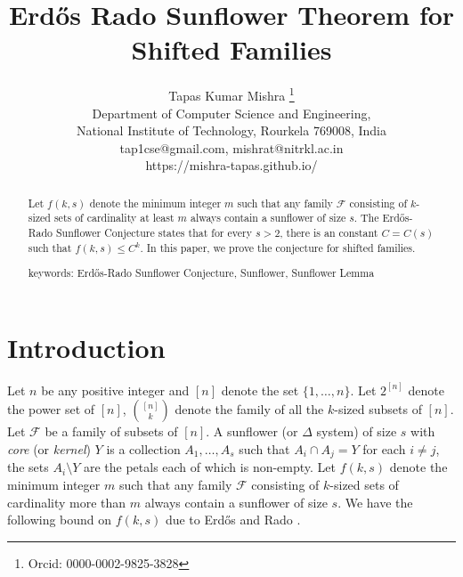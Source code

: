 \documentclass[runningheads,12pt,a4paper]{article}
\begin{document}
	\title{Erd\H{o}s Rado Sunflower Theorem for Shifted Families}
	\author{Tapas Kumar Mishra \footnote{Orcid: 0000-0002-9825-3828} \\
		Department of Computer Science and Engineering,\\
		National Institute of Technology, Rourkela
		769008, India\\
		tap1cse@gmail.com, mishrat@nitrkl.ac.in\\
		https://mishra-tapas.github.io/}
	\maketitle              %
	\begin{abstract}
		Let $f(k,s)$ denote the minimum integer $m$ such that
		any family $\mathcal{F}$ consisting of $k$-sized sets of cardinality at least $m$ always contain a sunflower of size $s$. The Erd\H{o}s-Rado Sunflower Conjecture states that 
		for every $s >2$, there is an constant $C=C(s)$ such that $f(k,s) \leq C^k$.
		In this paper, we prove the conjecture for shifted families.
		
		keywords: {Erd\H{o}s-Rado Sunflower Conjecture, Sunflower, Sunflower Lemma}
	\end{abstract}
	\section{Introduction}
	Let $n$ be any positive integer and 
	$[n]$ denote the set $\{1,\ldots,n\}$. Let $2^{[n]}$ denote the power set of $[n]$, $\binom{[n]}{k}$ denote the family of all the $k$-sized subsets of $[n]$.
	Let $\mathcal{F}$ be a family of subsets of $[n]$. 
	A sunflower (or $\Delta$ system) of size $s$ with \emph{core} (or \emph{kernel}) $Y$ is a collection $A_1,\ldots,A_s$ such that $A_i \cap A_j=Y$ for each $i\neq j$, the sets $A_i \setminus Y$ are the petals each of which is non-empty.
	Let $f(k,s)$ denote the minimum integer $m$ such that
	any family $\mathcal{F}$ consisting of $k$-sized sets of cardinality more than $m$ always contain a sunflower of size $s$. We have the following bound on $f(k,s)$ due to
	Erd\H{o}s and Rado \cite{erdosrado1960}.
	
\end{document}
